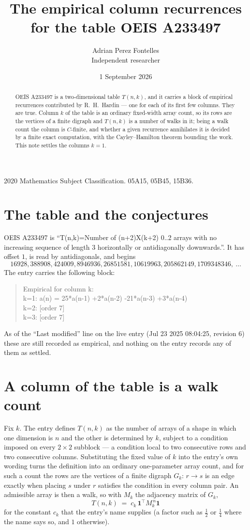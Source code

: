 \documentclass[11pt,a4paper]{article}
\title{The empirical column recurrences for the table OEIS A233497}
\author{Adrian Perez Fontelles\\ \small Independent researcher}
\date{1 September 2026}
\theoremstyle{plain}
\theoremstyle{definition}
\begin{document}
\maketitle

\begin{abstract}
OEIS A233497 is a two-dimensional table $T(n,k)$, and it carries a block of empirical
recurrences contributed by R.~H.~Hardin --- one for each of its first few columns. They are
true. Column $k$ of the table is an ordinary fixed-width array count, so its rows are the
vertices of a finite digraph and $T(n,k)$ is a number of walks in it; being a walk count the
column is $C$-finite, and whether a given recurrence annihilates it is decided by a finite
exact computation, with the Cayley--Hamilton theorem bounding the work. This note settles the columns $k=1$.
\end{abstract}

\noindent\small 2020 Mathematics Subject Classification. 05A15, 05B45, 15B36.\normalsize

\section{The table and the conjectures}

OEIS A233497 is ``T(n,k)=Number of (n+2)X(k+2) 0..2 arrays with no increasing sequence of length 3 horizontally or antidiagonally downwards.''. It has offset $1$, is
read by antidiagonals, and begins
\[
16928, 388908, 424009, 8946936, 26851581, 10619963, 205862149, 1709348346,\ \dots
\]
The entry carries the following block:
\begin{quote}\small
Empirical for column k:\\
k=1: a(n) = 25*a(n-1) +2*a(n-2) -21*a(n-3) +3*a(n-4)\\
k=2: [order 7]\\
k=3: [order 7]\\
\end{quote}
As of the ``Last modified'' line on the live entry (Jul 23 2025 08:04:25, revision 6) these are still
recorded as empirical, and nothing on the entry records any of them as settled.

\section{A column of the table is a walk count}

Fix $k$. The entry defines $T(n,k)$ as the number of arrays of a shape in which one dimension
is $n$ and the other is determined by $k$, subject to a condition imposed on every
$2\times2$ subblock --- a condition local to two consecutive rows and two consecutive columns.
Substituting the fixed value of $k$ into the entry's own wording turns the definition into an
ordinary one-parameter array count, and for such a count the rows are the vertices of a finite
digraph $G_k$: $r\to s$ is an edge exactly when placing $s$ under $r$ satisfies the condition
in every column pair. An admissible array is then a walk, so with $M_k$ the adjacency matrix
of $G_k$,
\[
T(n,k)\;=\;c_k\,\mathbf{1}^{\!\top}M_k^{\,n}\mathbf{1}
\]
for the constant $c_k$ that the entry's name supplies (a factor such as $\tfrac12$ or
$\tfrac14$ where the name says so, and $1$ otherwise).
\end{document}
